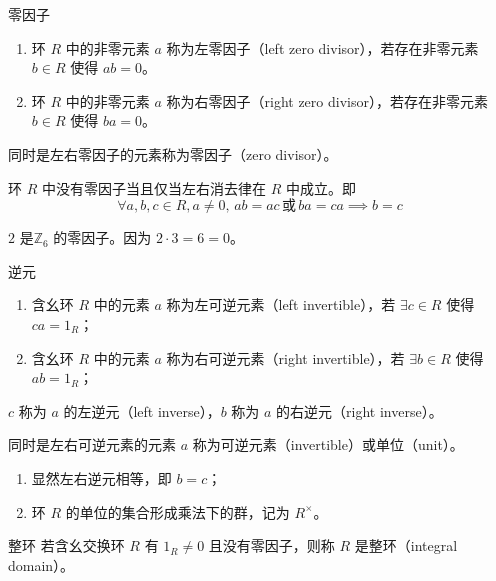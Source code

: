 \begin{definition}{零因子}
  \begin{enumerate}
    \item 环 $R$ 中的非零元素 $a$ 称为左零因子（left zero divisor），若存在非零元素 $b \in R$ 使得 $ab = 0$。
    \item 环 $R$ 中的非零元素 $a$ 称为右零因子（right zero divisor），若存在非零元素 $b \in R$ 使得 $ba = 0$。
  \end{enumerate}
  同时是左右零因子的元素称为零因子（zero divisor）。
\end{definition}

\begin{proposition}
  环 $R$ 中没有零因子当且仅当左右消去律在 $R$ 中成立。即
  \[\forall a,b,c \in R,a \ne 0,\, ab = ac\, \text{或}\, ba = ca \implies b = c\]
\end{proposition}

\hfill

\begin{example}
  $2$ 是$\mathbb{Z}_6$ 的零因子。因为 $2 \cdot 3 = 6 = 0$。
\end{example}

\hfill

\begin{definition}{逆元}
  \begin{enumerate}
    \item 含幺环 $R$ 中的元素 $a$ 称为左可逆元素（left invertible），若 $\exists c \in R$ 使得 $ca = 1_R$；
    \item 含幺环 $R$ 中的元素 $a$ 称为右可逆元素（right invertible），若 $\exists b \in R$ 使得 $ab = 1_R$；
  \end{enumerate}
  $c$ 称为 $a$ 的左逆元（left inverse），$b$ 称为 $a$ 的右逆元（right inverse）。

  同时是左右可逆元素的元素 $a$ 称为可逆元素（invertible）或单位（unit）。
\end{definition}

\begin{remark}
  \begin{enumerate}
    \item 显然左右逆元相等，即 $b = c$；
    \item 环 $R$ 的单位的集合形成乘法下的群，记为 $R^{\times}$。
  \end{enumerate}
\end{remark}

\begin{definition}{整环}
  若含幺交换环 $R$ 有 $1_R \ne 0$ 且没有零因子，则称 $R$ 是整环（integral domain）。
\end{definition}


